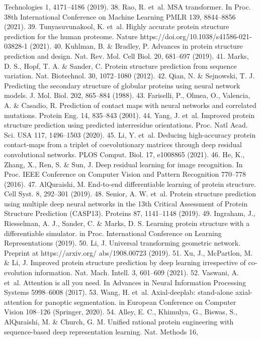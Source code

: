 Technologies 1, 4171–4186 (2019).
38.	 Rao, R. et al. MSA transformer. In Proc. 38th International Conference on Machine
Learning PMLR 139, 8844–8856 (2021).
39.	 Tunyasuvunakool, K. et al. Highly accurate protein structure prediction for the human
proteome. Nature https://doi.org/10.1038/s41586-021-03828-1 (2021).
40.	 Kuhlman, B. \& Bradley, P. Advances in protein structure prediction and design. Nat. Rev.
Mol. Cell Biol. 20, 681–697 (2019).
41.
Marks, D. S., Hopf, T. A. \& Sander, C. Protein structure prediction from sequence variation.
Nat. Biotechnol. 30, 1072–1080 (2012).
42.	 Qian, N. \& Sejnowski, T. J. Predicting the secondary structure of globular proteins using
neural network models. J. Mol. Biol. 202, 865–884 (1988).
43.	 Fariselli, P., Olmea, O., Valencia, A. \& Casadio, R. Prediction of contact maps with neural
networks and correlated mutations. Protein Eng. 14, 835–843 (2001).
44.	 Yang, J. et al. Improved protein structure prediction using predicted interresidue
orientations. Proc. Natl Acad. Sci. USA 117, 1496–1503 (2020).
45.	 Li, Y. et al. Deducing high-accuracy protein contact-maps from a triplet of coevolutionary
matrices through deep residual convolutional networks. PLOS Comput. Biol. 17,
e1008865 (2021).
46.	 He, K., Zhang, X., Ren, S. \& Sun, J. Deep residual learning for image recognition. In
Proc. IEEE Conference on Computer Vision and Pattern Recognition 770–778 (2016).
47.
AlQuraishi, M. End-to-end differentiable learning of protein structure. Cell Syst. 8,
292–301 (2019).
48.	 Senior, A. W. et al. Protein structure prediction using multiple deep neural networks in the
13th Critical Assessment of Protein Structure Prediction (CASP13). Proteins 87, 1141–1148
(2019).
49.	 Ingraham, J., Riesselman, A. J., Sander, C. \& Marks, D. S. Learning protein structure with a
differentiable simulator. in Proc. International Conference on Learning Representations
(2019).
50.	 Li, J. Universal transforming geometric network. Preprint at https://arxiv.org/
abs/1908.00723 (2019).
51.
Xu, J., McPartlon, M. \& Li, J. Improved protein structure prediction by deep learning
irrespective of co-evolution information. Nat. Mach. Intell. 3, 601–609 (2021).
52.	 Vaswani, A. et al. Attention is all you need. In Advances in Neural Information Processing
Systems 5998–6008 (2017).
53.	 Wang, H. et al. Axial-deeplab: stand-alone axial-attention for panoptic segmentation. in
European Conference on Computer Vision 108–126 (Springer, 2020).
54.	 Alley, E. C., Khimulya, G., Biswas, S., AlQuraishi, M. \& Church, G. M. Unified rational
protein engineering with sequence-based deep representation learning. Nat. Methods 16,
